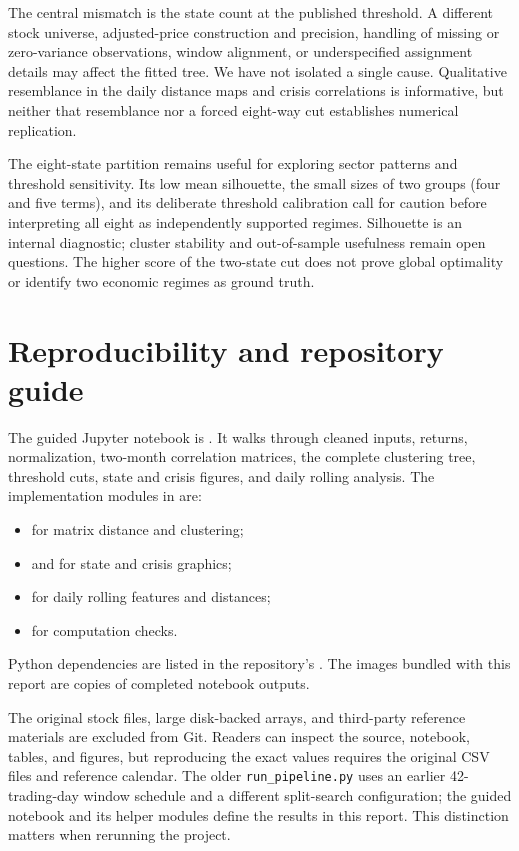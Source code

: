 \documentclass[11pt,a4paper]{article}
\begin{document}
The central mismatch is the state count at the published threshold. A different stock universe, adjusted-price construction and precision, handling of missing or zero-variance observations, window alignment, or underspecified assignment details may affect the fitted tree. We have not isolated a single cause. Qualitative resemblance in the daily distance maps and crisis correlations is informative, but neither that resemblance nor a forced eight-way cut establishes numerical replication.

The eight-state partition remains useful for exploring sector patterns and threshold sensitivity. Its low mean silhouette, the small sizes of two groups (four and five terms), and its deliberate threshold calibration call for caution before interpreting all eight as independently supported regimes. Silhouette is an internal diagnostic; cluster stability and out-of-sample usefulness remain open questions. The higher score of the two-state cut does not prove global optimality or identify two economic regimes as ground truth.

\section{Reproducibility and repository guide}
The guided Jupyter notebook is . It walks through cleaned inputs, returns, normalization, two-month correlation matrices, the complete clustering tree, threshold cuts, state and crisis figures, and daily rolling analysis. The implementation modules in  are:
\begin{itemize}
\item {} for matrix distance and clustering;
\item {} and  for state and crisis graphics;
\item {} for daily rolling features and distances;
\item {} for computation checks.
\end{itemize}
Python dependencies are listed in the repository's . The images bundled with this report are copies of completed notebook outputs.

The original stock files, large disk-backed arrays, and third-party reference materials are excluded from Git. Readers can inspect the source, notebook, tables, and figures, but reproducing the exact values requires the original CSV files and reference calendar. The older \texttt{run\_pipeline.py} uses an earlier 42-trading-day window schedule and a different split-search configuration; the guided notebook and its helper modules define the results in this report. This distinction matters when rerunning the project.
\end{document}
